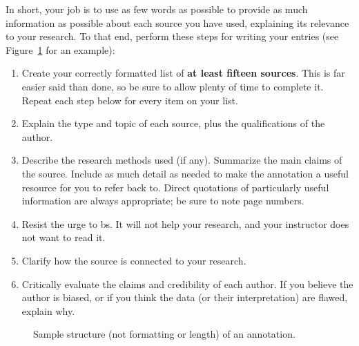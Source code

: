 \documentclass[11pt, twosides]{amsart}	%
\begin{document}
In short, your job is to use as few words as possible to provide as much information as possible about each source you have used, explaining its relevance to your research. To that end, perform these steps for writing your entries (see Figure~\ref{fig:sample-annotation-content} for an example):
\begin{enumerate}
	\item Create your correctly formatted list of \textbf{at least fifteen sources}. This is far easier said than done, so be sure to allow plenty of time to complete it. Repeat each step below for every item on your list.
	\item  Explain\label{step:source-id} the type and topic of each source, plus the qualifications of the author.
	\item  Describe the research methods used (if any). Summarize the main claims of the source. Include as much detail as needed to make the annotation a useful resource for you to refer back to. Direct quotations of particularly useful information are always appropriate; be sure to note page numbers.
	\item  Resist the urge to bs. It will not help your research, and your instructor does not want to read it.
	\item  Clarify how the source is connected to your research.
	\item  Critically evaluate the claims and credibility of each author. If you believe the author is biased, or if you think the data (or their interpretation) are flawed, explain why.
\end{enumerate}


\begin{figure}[ht]	
	\centering
	\caption{Sample structure (not formatting or length) of an annotation.}
\label{fig:sample-annotation-content}
\end{figure} %
\end{document}
